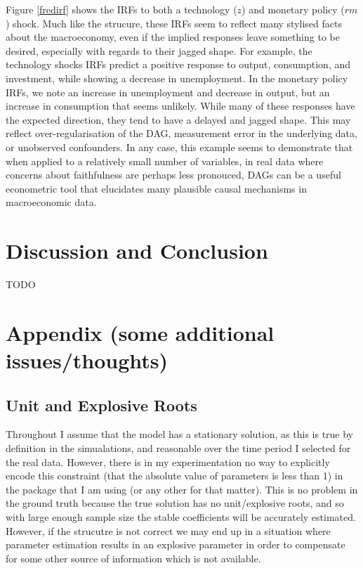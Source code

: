 \documentclass{article}
\begin{document}
Figure \ref{fredirf} shows the IRFs to both a technology ($z$) and monetary policy ($rm$) shock. Much like the strucure, these IRFs seem to reflect many stylised facts about the macroeconomy, even if the implied responses leave something to be desired, especially with regards to their jagged shape. For example, the technology shocks IRFs predict a positive response to output, consumption, and investment, while showing a decrease in unemployment. In the monetary policy IRFs, we note an increase in unemployment and decrease in output, but an increase in consumption that seems unlikely. While many of these responses have the expected direction, they tend to have a delayed and jagged shape. This may reflect over-regularisation of the DAG, measurement error in the underlying data, or unobserved confounders. In any case, this example seems to demonstrate that when applied to a relatively small number of variables, in real data where concerns about faithfulness are perhaps less pronouced, DAGs can be a useful econometric tool that elucidates many plausible causal mechanisms in macroeconomic data.

\section{Discussion and Conclusion}

TODO

\section{Appendix (some additional issues/thoughts)}

\subsection{Unit and Explosive Roots}

Throughout I assume that the model has a stationary solution, as this is true by definition in the simualations, and reasonable over the time period I selected for the real data. However, there is in my experimentation no way to explicitly encode this constraint (that the absolute value of parameters is less than 1) in the package that I am using (or any other for that matter). This is no problem in the ground truth because the true solution has no unit/explosive roots, and so with large enough sample size the stable coefficients will be accurately estimated. However, if the strucutre is not correct we may end up in a situation where parameter estimation results in an explosive parameter in order to compensate for some other source of information which is not available.
\end{document}
